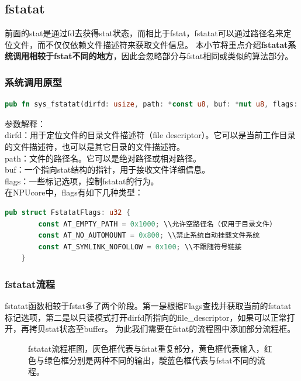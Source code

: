 \subsection{fstatat}
前面的stat是通过fd去获得stat状态，而相比于fstat，fstatat可以通过路径名来定位文件，而不仅仅依赖文件描述符来获取文件信息。
本小节将重点介绍\textbf{fstatat系统调用相较于fstat不同的地方}，因此会忽略部分与fstat相同或类似的算法部分。

\subsubsection{系统调用原型}
\begin{lstlisting}[language={Rust},
	caption={os/src/syscall/fs.rs}]
    pub fn sys_fstatat(dirfd: usize, path: *const u8, buf: *mut u8, flags: u32);
\end{lstlisting}
参数解释：\\
dirfd：用于定位文件的目录文件描述符（file descriptor）。它可以是当前工作目录的文件描述符，也可以是其它目录的文件描述符。\\
path：文件的路径名。它可以是绝对路径或相对路径。\\
buf：一个指向stat结构的指针，用于接收文件详细信息。\\
flags：一些标记选项，控制fstatat的行为。\\
在NPUcore中，flags有如下几种类型：
\begin{lstlisting}[language={Rust},
	caption={NPUcore中的fstatat~flags选项}]
pub struct FstatatFlags: u32 {
        const AT_EMPTY_PATH = 0x1000; \\允许空路径名（仅用于目录文件）
        const AT_NO_AUTOMOUNT = 0x800; \\禁止系统自动挂载文件系统
        const AT_SYMLINK_NOFOLLOW = 0x100; \\不跟随符号链接
    }
\end{lstlisting}
\subsubsection{fstatat流程}
fstatat函数相较于fstat多了两个阶段。第一是根据Flags查找并获取当前的fstatat标记选项，第二是以只读模式打开dirfd所指向的file_descriptor，如果可以正常打开，再拷贝stat状态至buffer。
为此我们需要在fstat的流程图中添加部分流程框。
\begin{figure}[H]
    \centering
    \caption{fstatat流程框图，灰色框代表与fstat重复部分，黄色框代表输入，红色与绿色框分别是两种不同的输出，靛蓝色框代表与fstat不同的流程。}
\end{figure}
